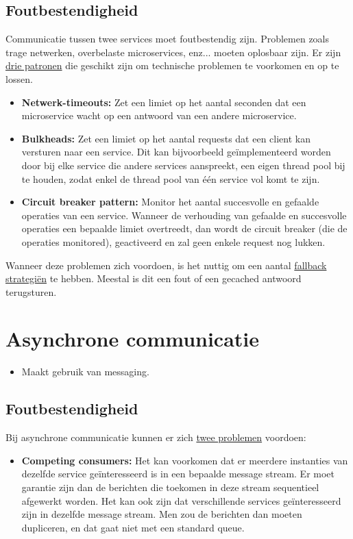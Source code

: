\documentclass{report}
\begin{document}
	\subsection{Foutbestendigheid}
	Communicatie tussen twee services moet foutbestendig zijn. Problemen zoals trage netwerken, overbelaste microservices, enz... moeten oplosbaar zijn. Er zijn \underline{drie patronen} die geschikt zijn om technische problemen te voorkomen en op te lossen.
	\begin{itemize}
		\item[\info] \textbf{Netwerk-timeouts:} Zet een limiet op het aantal seconden dat een microservice wacht op een antwoord van een andere microservice.
		\item[\info] \textbf{Bulkheads:} Zet een limiet op het aantal requests dat een client kan versturen naar een service. Dit kan bijvoorbeeld geïmplementeerd worden door bij elke service die andere services aanspreekt, een eigen thread pool bij te houden, zodat enkel de thread pool van één service vol komt te zijn.
		\item[\info] \textbf{Circuit breaker pattern:} Monitor het aantal succesvolle en gefaalde operaties van een service. Wanneer de verhouding van gefaalde en succesvolle operaties een bepaalde limiet overtreedt, dan wordt de circuit breaker (die de operaties monitored), geactiveerd en zal geen enkele request nog lukken.
	\end{itemize}
	Wanneer deze problemen zich voordoen, is het nuttig om een aantal \underline{fallback strategiën} te hebben. Meestal is dit een fout of een gecached antwoord terugsturen.
	\section{Asynchrone communicatie}
	\begin{itemize}
		\item[\info] Maakt gebruik van messaging.

	\end{itemize}
	\subsection{Foutbestendigheid}
	Bij asynchrone communicatie kunnen er zich \underline{twee problemen} voordoen:
	\begin{itemize}
		\item[\info] \textbf{Competing consumers:} Het kan voorkomen dat er meerdere instanties van dezelfde service geïnteresseerd is in een bepaalde message stream. Er moet garantie zijn dan de berichten die toekomen in deze stream sequentieel afgewerkt worden. Het kan ook zijn dat verschillende services geïnteresseerd zijn in dezelfde message stream. Men zou de berichten dan moeten dupliceren, en dat gaat niet met een standard queue.
	\end{itemize}
\end{document}
